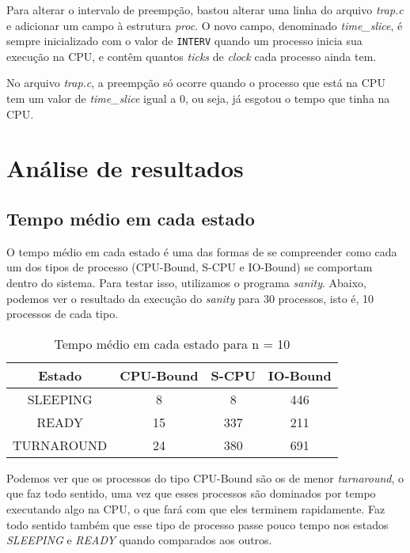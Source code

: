 \documentclass{article}
\begin{document}
Para alterar o intervalo de preempção, bastou alterar uma linha do arquivo
\textit{trap.c} e adicionar um campo à estrutura \textit{proc}. O novo campo,
denominado \textit{time\_slice}, é sempre inicializado com o valor de
\texttt{INTERV} quando um processo inicia sua execução na CPU, e contêm quantos
\textit{ticks} de \textit{clock} cada processo ainda tem.

No arquivo \textit{trap.c}, a preempção só ocorre quando o processo que está na
CPU tem um valor de \textit{time\_slice} igual a 0, ou seja, já esgotou o tempo
que tinha na CPU.

\section{Análise de resultados}

\subsection{Tempo médio em cada estado}

O tempo médio em cada estado é uma das formas de se compreender como cada um
dos tipos de processo (CPU-Bound, S-CPU e IO-Bound) se comportam dentro do
sistema. Para testar isso, utilizamos o programa \textit{sanity}. Abaixo,
podemos ver o resultado da execução do \textit{sanity} para 30 processos, isto
é, 10 processos de cada tipo.

\begin{table}[H]
      \centering
      \begin{tabular}{|c|c|c|c|}
            \hline
            Estado     & CPU-Bound & S-CPU & IO-Bound
            \\
            \hline
            SLEEPING   & 8         & 8     & 446      \\
            READY      & 15        & 337   & 211      \\
            TURNAROUND & 24        & 380   & 691      \\
            \hline
      \end{tabular}
      \caption{Tempo médio em cada estado para n = 10}
\end{table}

Podemos ver que os processos do tipo CPU-Bound são os de menor
\textit{turnaround}, o que faz todo sentido, uma vez que esses processos são
dominados por tempo executando algo na CPU, o que fará com que eles terminem
rapidamente. Faz todo sentido também que esse tipo de processo passe pouco
tempo
nos estados \textit{SLEEPING} e \textit{READY} quando comparados aos outros.
\end{document}
